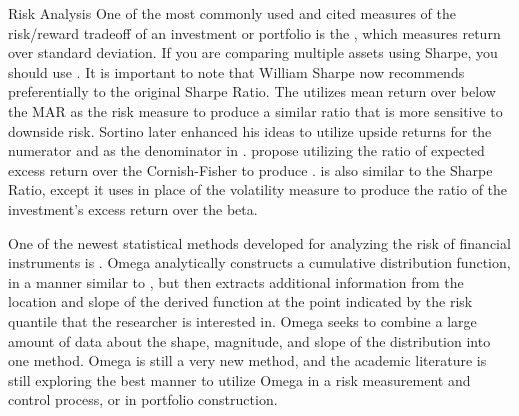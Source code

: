 \documentclass[12pt,letterpaper,english]{article}
\begin{document}
\begin{Section}{Risk Analysis}
One of the most commonly used and cited measures of the risk/reward tradeoff of an investment or portfolio is the , which measures return over standard deviation.  If you are comparing multiple assets using Sharpe, you should use . It is important to note that William Sharpe now recommends  preferentially to the original Sharpe Ratio. The  utilizes mean return over  below the MAR as the risk measure to produce a similar ratio that is more sensitive to downside risk. Sortino later enhanced his ideas to utilize upside returns for the numerator and  as the denominator in . \Cite{Favre and Galeano(2002)} propose utilizing the ratio of expected excess return over the Cornish-Fisher  to produce .  is also similar to the Sharpe Ratio, except it uses  in place of the volatility measure to produce the ratio of the investment's excess return over the beta.

One of the newest statistical methods developed for analyzing the risk of financial instruments is .  Omega analytically constructs a cumulative distribution function, in a manner similar to , but then extracts additional information from the location and slope of the derived function at the point indicated by the risk quantile that the researcher is interested in.  Omega seeks to combine a large amount of data about the shape, magnitude, and slope of the distribution into one method.  Omega is still a very new method, and the academic literature is still exploring the best manner to utilize Omega in a risk measurement and control process, or in portfolio construction.


\end{Section}
\end{document}
